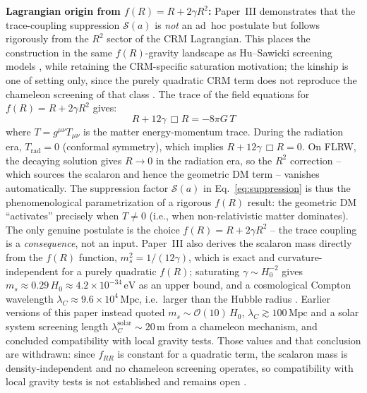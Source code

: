 \documentclass[aps,prd,twocolumn,superscriptaddress,nofootinbib,floatfix]{revtex4-2}
\begin{document}
\textbf{Lagrangian origin from $f(R) = R + 2\gamma R^2$:} Paper~III \cite{Geiger2026c} demonstrates that the trace-coupling suppression $\mathcal{S}(a)$ is \textit{not} an ad~hoc postulate but follows rigorously from the $R^2$ sector of the CRM Lagrangian. This places the construction in the same $f(R)$-gravity landscape as Hu--Sawicki screening models \cite{HuSawicki2007}, while retaining the CRM-specific saturation motivation; the kinship is one of setting only, since the purely quadratic CRM term does not reproduce the chameleon screening of that class \cite{Geiger2026c}. The trace of the field equations for $f(R) = R + 2\gamma R^2$ gives:
\begin{equation}
R + 12\gamma\,\Box R = -8\pi G\,T
\label{eq:trace_fR}
\end{equation}
where $T = g^{\mu\nu}T_{\mu\nu}$ is the matter energy-momentum trace. During the radiation era, $T_{\mathrm{rad}} = 0$ (conformal symmetry), which implies $R + 12\gamma\,\Box R = 0$. On FLRW, the decaying solution gives $R \to 0$ in the radiation era, so the $R^2$ correction -- which sources the scalaron and hence the geometric DM term -- vanishes automatically. The suppression factor $\mathcal{S}(a)$ in Eq.~\eqref{eq:suppression} is thus the phenomenological parametrization of a rigorous $f(R)$ result: the geometric DM ``activates'' precisely when $T \neq 0$ (i.e., when non-relativistic matter dominates). The only genuine postulate is the choice $f(R) = R + 2\gamma R^2$ -- the trace coupling is a \textit{consequence}, not an input. Paper~III also derives the scalaron mass directly from the $f(R)$ function, $m_s^2 = 1/(12\gamma)$, which is exact and curvature-independent for a purely quadratic $f(R)$; saturating $\gamma \sim H_0^{-2}$ gives $m_s \approx 0.29\,H_0 \approx 4.2 \times 10^{-34}\,\mathrm{eV}$ as an upper bound, and a cosmological Compton wavelength $\lambda_C \approx 9.6 \times 10^{4}\,\mathrm{Mpc}$, i.e.\ larger than the Hubble radius \cite{Geiger2026c}. Earlier versions of this paper instead quoted $m_s \sim \mathcal{O}(10)\,H_0$, $\lambda_C \gtrsim 100\,\mathrm{Mpc}$ and a solar system screening length $\lambda_C^{\mathrm{solar}} \sim 20\,\mathrm{m}$ from a chameleon mechanism, and concluded compatibility with local gravity tests. Those values and that conclusion are withdrawn: since $f_{RR}$ is constant for a quadratic term, the scalaron mass is density-independent and no chameleon screening operates, so compatibility with local gravity tests is not established and remains open \cite{Geiger2026c}.
\end{document}
